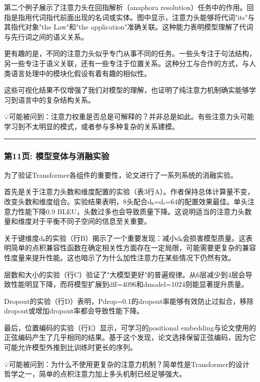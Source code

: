 \documentclass[11pt,a4paper]{article}
\begin{document}
第二个例子展示了注意力头在回指解析（anaphora resolution）任务中的作用。回指是指用代词指代前面出现的名词或实体。图中显示，注意力头能够将代词"its"与其指代对象"the Law"和"the application"准确关联。这种能力表明模型理解了代词与先行词之间的语义关系。

更有趣的是，不同的注意力头似乎专门从事不同的任务。一些头专注于句法结构，另一些专注于语义关联，还有一些专注于位置关系。这种分工与合作的方式，与人类语言处理中的模块化假设有着有趣的相似性。

这些可视化结果不仅增强了我们对模型的理解，也证明了纯注意力机制确实能够学习到语言中的复杂结构关系。

💡可能被问到：注意力权重是否总是可解释的？并非总是如此。有些注意力头可能学习到不太明显的模式，或者参与多种复杂的关系建模。

\vspace{0.5em}\noindent\rule{\textwidth}{0.4pt}\vspace{0.5em}

\subsubsection*{第11页: 模型变体与消融实验}

为了验证Transformer各组件的重要性，论文进行了一系列系统的消融实验。

首先是关于注意力头数和维度配置的实验（表3行A）。作者保持总体计算量不变，改变头数和维度组合。实验结果表明，8头配合dₖ=dᵥ=64的配置效果最佳。单头注意力性能下降0.9 BLEU，头数过多也会导致质量下降。这说明适当的注意力头数量和维度对于平衡不同子空间的信息至关重要。

关于键维度dₖ的实验（行B）揭示了一个重要发现：减小dₖ会损害模型质量。这表明简单的点积兼容性函数在确定相关性方面存在一定局限，可能需要更复杂的兼容性度量来提升性能。这也暗示了为什么加性注意力在某些情况下仍然有效。

层数和大小的实验（行C）验证了"大模型更好"的普遍规律。从6层减少到4层会导致性能明显下降，而将模型扩展到dff=4096和dmodel=1024则能显著提升质量。

Dropout的实验（行D）表明，Pdrop=0.1的dropout率能够有效防止过拟合，移除dropout或增加dropout率都会导致性能下降。

最后，位置编码的实验（行E）显示，可学习的positional embedding与论文使用的正弦编码产生了几乎相同的结果。基于这个发现，论文选择保留正弦编码，因为它可能允许模型外推到比训练时更长的序列。

💡可能被问到：为什么不使用更复杂的注意力机制？简单性是Transformer的设计哲学之一，简单的点积注意力加上多头机制已经足够强大。
\end{document}

